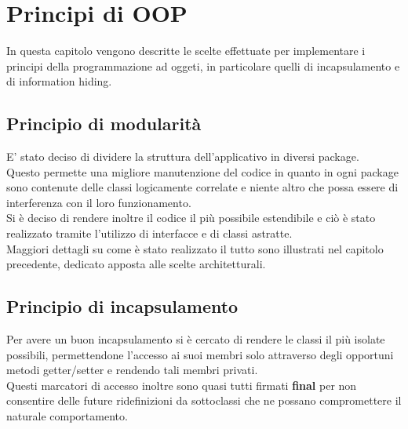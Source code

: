 % 
%
%

\section{Principi di OOP}
In questa capitolo vengono descritte le scelte effettuate per implementare i principi della programmazione ad oggeti, in particolare quelli di incapsulamento e di information hiding. \\

	\subsection{Principio di modularità}
E' stato deciso di dividere la struttura dell'applicativo in diversi package. \\
Questo permette una migliore manutenzione del codice in quanto in ogni package sono contenute delle classi logicamente correlate e niente altro che possa essere di interferenza con il loro funzionamento. \\
Si è deciso di rendere inoltre il codice il più possibile estendibile e ciò è stato realizzato tramite l'utilizzo di interfacce e di classi astratte. \\
Maggiori dettagli su come è stato realizzato il tutto sono illustrati nel capitolo precedente, dedicato apposta alle scelte architetturali.

	\subsection{Principio di incapsulamento}
Per avere un buon incapsulamento si è cercato di rendere le classi il più isolate possibili, permettendone l'accesso ai suoi membri solo attraverso degli opportuni metodi getter/setter e rendendo tali membri privati. \\
Questi marcatori di accesso inoltre sono quasi tutti firmati \textbf{final} per non consentire delle future ridefinizioni da sottoclassi che ne possano compromettere il naturale comportamento. \\

